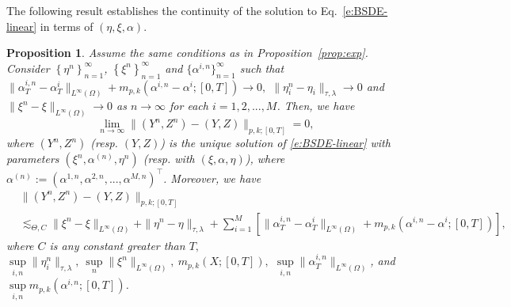 \documentclass[11pt,reqno]{amsart}
\newtheorem{proposition}{Proposition}[section]
\numberwithin{equation}{section}
\begin{document}
The following result establishes the continuity of the solution to  Eq.~\eqref{e:BSDE-linear} in terms of $(\eta, \xi, \alpha)$.

\begin{proposition}\label{prop:continuity of solution map}
Assume the same conditions as in Proposition~\ref{prop:exp}. Consider $\left\{\eta^{n}\right\}^{\infty}_{n = 1}$, $\left\{\xi^{n}\right\}^{\infty}_{n = 1}$ and $\{\alpha^{i,n}\}_{n=1}^\infty$ such that $\|\alpha^{i,n}_{T} - \alpha^{i}_{T}\|_{L^{\infty}(\Omega)} + m_{p,k}(\alpha^{i,n}-\alpha^{i};[0,T])\rightarrow 0,$ $\|\eta^{n}_{i} - \eta_{i}\|_{\tau,\lambda}\rightarrow 0 $ and $\|\xi^{n} - \xi\|_{L^{\infty}(\Omega)}\rightarrow 0$ as $n\rightarrow\infty$ for each $i=1,2,...,M$. Then, we have $$\lim_{n\to \infty}\|(Y^{n},Z^{n}) - (Y,Z)\|_{p,k;[0,T]}=0,$$ 
where $(Y^{n},Z^{n})$ (resp. $(Y,Z)$) is the unique solution of \eqref{e:BSDE-linear} with parameters $(\xi^{n},\alpha^{(n)},\eta^{n})$ (resp. with $(\xi,\alpha,\eta)$), where $\alpha^{(n)}:=(\alpha^{1,n},\alpha^{2,n},...,\alpha^{M,n})^{\top}$.
Moreover, we have
\begin{equation*}
\begin{aligned}
&\|(Y^{n},Z^{n}) - (Y,Z)\|_{p,k;[0,T]}\\
& \lesssim_{\Theta,C} \| \xi^{n} - \xi\|_{L^{\infty}(\Omega)} + \|\eta^{n} - \eta\|_{\tau,\lambda} + \sum_{i=1}^{M}\left[\|\alpha^{i,n}_{T} - \alpha^{i}_{T}\|_{L^{\infty}(\Omega)} + m_{p,k}(\alpha^{i,n} - \alpha^{i};[0,T])\right],
\end{aligned}
\end{equation*}
where $C$ is any constant greater than $T,$ $\sup\limits_{i, n}\|\eta^{n}_{i}\|_{\tau,\lambda},\  \sup\limits_{n}\|\xi^{n}\|_{L^{\infty}(\Omega)},\  m_{p,k}(X;[0,T]),$ $\sup\limits_{i,n}\|\alpha^{i,n}_{T}\|_{L^{\infty}(\Omega)}$, and $\sup\limits_{i,n}m_{p,k}(\alpha^{i,n};[0,T])$.
\end{proposition}
\end{document}
